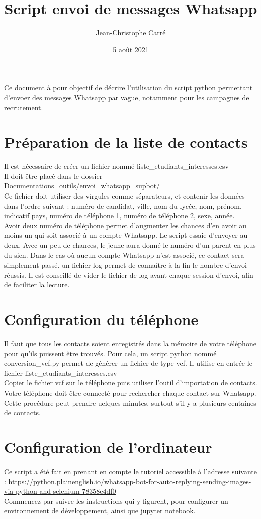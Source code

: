 \documentclass[10pt]{article}
\title{Script envoi de messages Whatsapp}
\author{Jean-Christophe Carré}
\date{5 août 2021}
\begin{document}
\maketitle
Ce document à pour objectif de décrire l'utilisation du script python permettant d'envoer des messages Whatsapp par vague, notamment pour les campagnes de recrutement.\\



\section{Préparation de la liste de contacts}
Il est nécessaire de créer un fichier nommé liste\_etudiants\_interesses.csv\\
Il doit être placé dans le dossier Documentations\_outils/envoi\_whatsapp\_supbot/\\
Ce fichier doit utiliser des virgules comme séparateurs, et contenir les données dans l'ordre suivant : numéro de candidat, ville, nom du lycée, nom, prénom, indicatif pays, numéro de téléphone 1, numéro de téléphone 2, sexe, année.\\

Avoir deux numéro de téléphone permet d'augmenter les chances d'en avoir au moins un qui soit associé à un compte Whatsapp. Le script essaie d'envoyer au deux. Avec un peu de chances, le jeune aura donné le numéro d'un parent en plus du sien. Dans le cas où aucun compte Whatsapp n'est associé, ce contact sera simplement passé. un fichier log permet de connaître à la fin le nombre d'envoi réussis. Il est conseillé de vider le fichier de log avant chaque session d'envoi, afin de faciliter la lecture.

\section{Configuration du téléphone}
Il faut que tous les contacts soient enregistrés dans la mémoire de votre téléphone pour qu'ils puissent être trouvés. Pour cela, un script python nommé conversion\_vcf.py permet de générer un fichier de type vcf. Il utilise en entrée le fichier liste\_etudiants\_interesses.csv\\
Copier le fichier vcf sur le téléphone puis utiliser l'outil d'importation de contacts. Votre téléphone doit être connecté pour rechercher chaque contact sur Whatsapp. Cette procédure peut prendre uelques minutes, surtout s'il y a plusieurs centaines de contacts.

\section{Configuration de l'ordinateur}
Ce script a été fait en prenant en compte le tutoriel accessible à l'adresse suivante : \url{https://python.plainenglish.io/whatsapp-bot-for-auto-replying-sending-images-via-python-and-selenium-78358e4df0}\\
Commencez par suivre les instructions qui y figurent, pour configurer un environnement de développement, ainsi que jupyter notebook.\\
\end{document}
